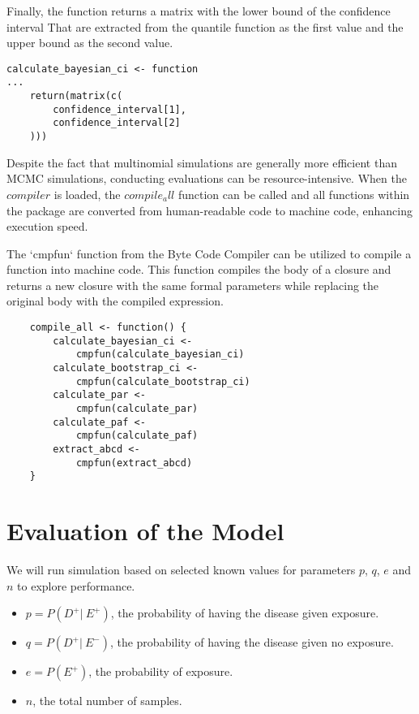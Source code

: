 Finally, the function returns a matrix with the lower bound of the confidence interval That are extracted from the quantile function as the first value and the upper bound as the second value.

\begin{lstlisting}
calculate_bayesian_ci <- function
...
    return(matrix(c(
        confidence_interval[1],
        confidence_interval[2]
    )))
\end{lstlisting}

Despite the fact that multinomial simulations are generally more efficient than MCMC simulations, conducting evaluations can be resource-intensive. When the $compiler$ is loaded, the $compile_all$ function can be called and all functions within the package are converted from human-readable code to machine code, enhancing execution speed. 

The `cmpfun` function from the Byte Code Compiler can be utilized to compile a function into machine code. This function compiles the body of a closure and returns a new closure with the same formal parameters while replacing the original body with the compiled expression. \cite{byteCodeCompiler}

\begin{lstlisting}
    compile_all <- function() {
        calculate_bayesian_ci <-
            cmpfun(calculate_bayesian_ci)
        calculate_bootstrap_ci <-
            cmpfun(calculate_bootstrap_ci)
        calculate_par <-
            cmpfun(calculate_par)
        calculate_paf <-
            cmpfun(calculate_paf)
        extract_abcd <-
            cmpfun(extract_abcd)
    }
\end{lstlisting}\label{compileCode}

\section{Evaluation of the Model} \label{sec:Evaluation}

We will run simulation based on selected known values for parameters $p$, $q$, $e$ and $n$ to explore performance.
\begin{itemize}
    \item $p = P(D^+ |\ E^+)$, the probability of having the disease given exposure.
    \item $q = P(D^+ |\ E^-)$, the probability of having the disease given no exposure.
    \item $e = P(E^+)$, the probability of exposure.
    \item $n$, the total number of samples. 
\end{itemize} \label{pqeParams}


